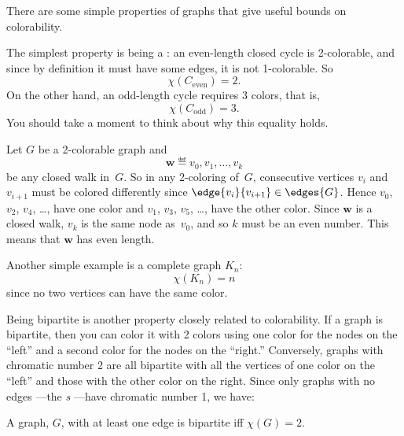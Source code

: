 There are some simple properties of graphs that give useful bounds on
colorability. 
\begin{editingnotes}
\end{editingnotes}
The simplest property is being a : an even-length closed cycle
is 2-colorable, and since by definition it must have some edges, it is not
1-colorable.  So
\[
\chi(C_{\text{even}}) = 2.
\]
On the other hand, an odd-length cycle requires 3 colors, that is,
\begin{equation}\label{Codd3}
\chi(C_{\text{odd}}) = 3.
\end{equation}
You should take a moment to think about why this equality holds.
\begin{editingnotes}

Let $G$ be a 2-colorable graph and
\begin{equation*}
    \mathbf{w} \eqdef v_0, v_1, \dots, v_k
\end{equation*}
be any closed walk in~$G$.  So in any 2-coloring of~$G$, consecutive
vertices $v_i$ and $v_{i + 1}$ must be colored differently since
$\edge{v_i}{v_{i + 1}} \in \edges{G}$.  
Hence $v_0$, $v_2$, $v_4$, \dots, have one color and $v_1$, $v_3$,
$v_5$, \dots, have the other color.  Since $\mathbf{w}$ is a closed
walk, $v_k$ is the same node as~$v_0$, and so $k$ must be an even
number.  This means that $\mathbf{w}$ has even length.
\end{editingnotes}
Another simple example is a complete graph $K_n$:
\[
\chi(K_n) = n
\]
since no two vertices can have the same color.

Being bipartite is another property closely related to colorability.  If a
graph is bipartite, then you can color it with 2 colors using one color
for the nodes on the ``left'' and a second color for the nodes on the
``right.''  Conversely, graphs with chromatic number 2 are all bipartite
with all the vertices of one color on the ``left'' and those with the
other color on the right.  Since only graphs with no edges ---the
\emph{s} ---have chromatic number 1, we have:  \iffalse
Empty graphs are
bipartite as long they have at least two vertices: a graph with only one
vertex is not bipartite because its vertex set cannot be partitioned into
two \emph{nonempty} subsets.\fi
\begin{lemma}\label{2color-iff-bip}
A graph, $G$, with at least one edge is bipartite iff $\chi(G) = 2$.
\end{lemma}

